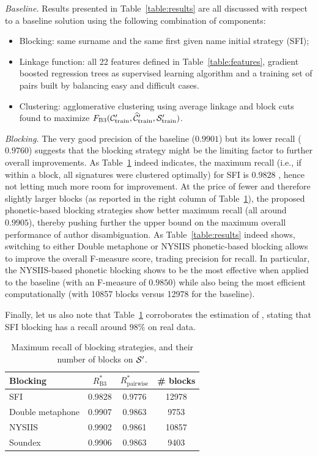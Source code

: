 \documentclass{article}
\begin{document}
\textit{Baseline.} Results presented in Table~\ref{table:results} are all discussed with
respect to a baseline solution using the following combination of components:
\begin{itemize}
\item Blocking: same surname and the same first given name initial strategy (SFI);
\item Linkage function: all 22 features defined in Table~\ref{table:features},
    gradient boosted regression trees as supervised learning algorithm
    and a training set of pairs built by balancing easy and difficult cases.
\item Clustering: agglomerative clustering using average linkage and
    block cuts found to maximize $F_\text{B3}({\cal C}_\text{train}^\prime, \widehat{\cal C}_\text{train}^\prime, {\cal S}_\text{train}^\prime)$.
\end{itemize}


\textit{Blocking.} The very good precision of the baseline ($0.9901$) but its
lower recall ($0.9760$) suggests that the blocking strategy might be the
limiting factor to further overall improvements. As Table~\ref{table:blocking}
indeed indicates, the maximum recall (i.e., if within a block, all signatures
were clustered optimally) for SFI is $0.9828$ , hence not letting much more
room for improvement. At the price of fewer and therefore slightly larger
blocks (as reported in the right column of Table~\ref{table:blocking}), the
proposed phonetic-based blocking strategies show better maximum recall (all
around $0.9905$), thereby pushing further the upper bound on the maximum overall
performance of author disambiguation. As Table~\ref{table:results} indeed shows,
switching to either Double metaphone or NYSIIS phonetic-based blocking allows
to improve the overall F-measure score, trading precision for recall. In particular,
the NYSIIS-based phonetic blocking shows to be the most effective when applied
to the baseline (with an F-measure of $0.9850$) while also being the most
efficient computationally (with 10857 blocks versus 12978 for the baseline).

Finally, let us also note that Table~\ref{table:blocking} corroborates the
estimation of \citep{torvik2009author}, stating that SFI blocking has a recall
around $98\%$ on real data.

\begin{table}
\caption{Maximum recall of blocking strategies, and their number of blocks on ${\cal S}^\prime$.}
\label{table:blocking}
\centering
\begin{tabular}{|l|cc|c|}
  \hline
  \textbf{Blocking} & $R_\text{B3}^*$ & $R_\text{pairwise}^*$ & \# blocks \\
  \hline
  \hline
    SFI & 0.9828 & 0.9776 & 12978 \\
    Double metaphone & 0.9907 & 0.9863 & 9753 \\
    NYSIIS & 0.9902 & 0.9861 & 10857 \\
    Soundex & 0.9906 & 0.9863 & 9403 \\
  \hline
\end{tabular}
\end{table}
\end{document}
